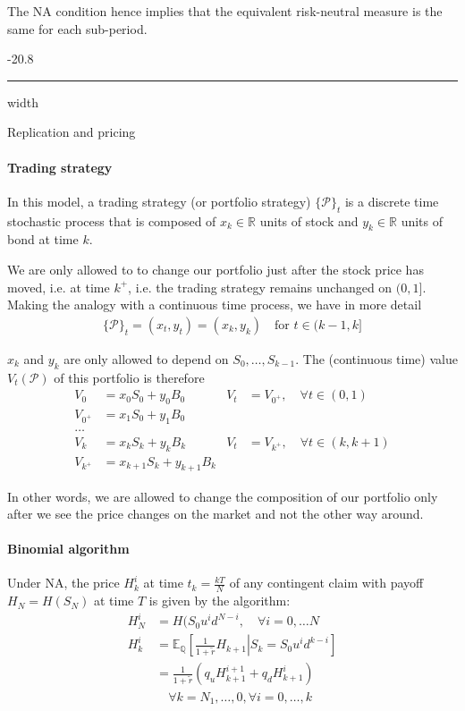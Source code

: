\documentclass[a4paper,landscape,7pt,fleqn]{scrartcl}
\makeatletter
\renewcommand{\subsubsection}{\@startsection{subsubsection}{1}{0mm}%
{-2\baselineskip}{0.8\baselineskip}%
{\hrule depth 0.2pt width\columnwidth\vspace*{1.2em}\normalsize\bfseries}}
\makeatother
\begin{document}
\begin{multicols*}{3}
The NA condition hence implies that the equivalent risk-neutral measure is the same for each sub-period.

\subsubsection{Replication and pricing}

\paragraph{Trading strategy}
In this model, a trading strategy (or portfolio strategy) $\{ \mathcal{P} \}_t$ is a discrete time stochastic process that is composed of $x_k \in \mathbb{R}$ units of stock and $y_k \in \mathbb{R}$ units of bond at time $k$.

We are only allowed to to change our portfolio just after the stock price has moved, i.e. at time $k^+$, i.e. the trading strategy remains unchanged on $(0,1]$. Making the analogy with a continuous time process, we have in more detail
\begin{align*}
\{ \mathcal{P} \}_t = (x_t, y_t) = (x_k, y_k) \quad \text{for } t \in (k-1,k]
\end{align*}

$x_k$ and $y_k$ are only allowed to depend on $S_0, \ldots , S_{k-1}$. The (continuous time) value $V_t(\mathcal{P})$ of this portfolio is therefore
\begin{align*}
V_0 &= x_0 S_0 + y_0 B_0 & V_t &= V_{0^+} , \quad \forall t \in (0,1) \\
V_{0^+} &= x_1 S_0 + y_1 B_0 \\
\ldots \\
V_k &= x_k S_k + y_k B_k & V_t &= V_{k^+} , \quad \forall t \in (k,k+1)  \\
V_{k^+} &= x_{k+1} S_k + y_{k+1} B_k
\end{align*}

In other words, we are allowed to change the composition of our portfolio only after we see the price changes on the market and not the other way around.

\paragraph{Binomial algorithm}
Under NA, the price $H_k^i$ at time $t_k = \frac{k T}{N}$ of any contingent claim with payoff $H_N = H(S_N)$ at time $T$ is given by the algorithm:
\begin{align*}
H_N^i &= H(S_0 u^i d^{N-i}, \quad \forall i = 0, \ldots N \\
H_k^i &= \mathbb{E}_\mathbb{Q} \left[ \left. \frac{1}{1 + \tilde r} H_{k+1} \right| S_k = S_0 u^i d^{k-i} \right] \\
&= \frac{1}{1+ \tilde r} (q_u H_{k+1}^{i+1} + q_d H_{k+1}^i) \\
& \quad \forall k = N_1, \ldots, 0, \forall i = 0, \ldots, k
\end{align*}


\end{multicols*}
\end{document}
